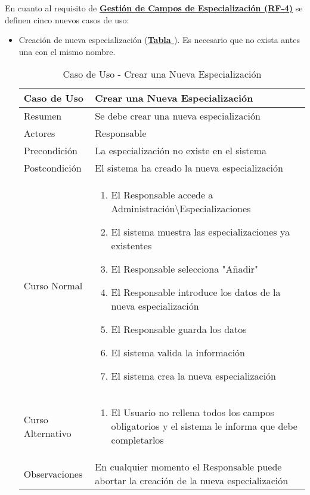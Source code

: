 En cuanto al requisito de \textbf{\hyperref[tab:rfGestEspec]{Gestión de Campos de Especialización (RF-4)}} se definen cinco nuevos casos de uso:
\begin{itemize}
	\item \addtocounter{tabla}{1} Creación de nueva especialización (\textbf{\hyperref[tab:curCrearEspec]{Tabla }}). Es necesario que no exista antes una con el mismo nombre.
		\begin{table}[!htbp]
		  \centering  \addtocounter{casouso}{1}
		  \begin{tabular}{|l | p{100mm}|}
		    \textbf{Caso de Uso}  & \textbf{Crear una Nueva Especialización} \\ \hline
		    Resumen 		 & Se debe crear una nueva especialización \\ \hline
		    Actores  		 & Responsable \\ \hline
		    Precondición  	 & La especialización no existe en el sistema  \\ \hline
		    Postcondición  	 & El sistema ha creado la nueva especialización \\ \hline
		    Curso Normal   	 & \begin{enumerate}
			  \item El Responsable accede a Administración\textbackslash Especializaciones
			  \item El sistema muestra las especializaciones ya existentes
			  \item El Responsable selecciona "Añadir"
			  \item El Responsable introduce los datos de la nueva especialización
			  \item El Responsable guarda los datos
			  \item El sistema valida la información
			  \item El sistema crea la nueva especialización
		    \end{enumerate}  \\ \hline
		    Curso Alternativo  & \begin{enumerate}
			  \item El Usuario no rellena todos los campos obligatorios y el sistema le informa que debe completarlos
		    \end{enumerate}  \\ \hline
		    Observaciones 	 & En cualquier momento el Responsable puede abortar la creación de la nueva especialización  \\ 		\hline
		  \end{tabular}
		  \caption{Caso de Uso  - Crear una Nueva Especialización }
		  \label{tab:curCrearEspec}
		\end{table}
		\FloatBarrier
	

\end{itemize}
